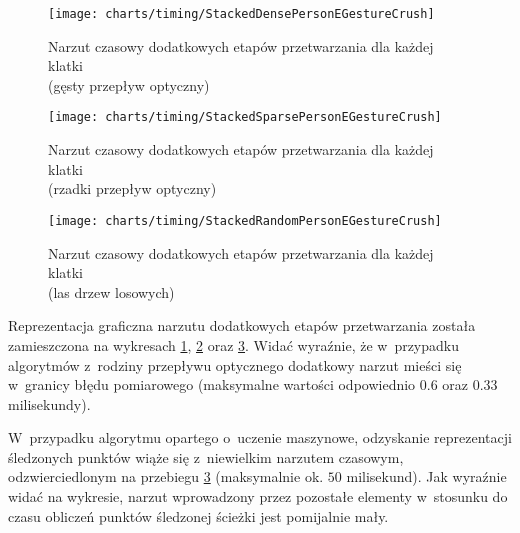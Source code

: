       \begin{figure}[!ht]
        \centering
        \texttt{[image: charts/timing/StackedDensePersonEGestureCrush]}
        \caption[Narzut czasowy dodatkowych etapów przetwarzania dla każdej klatki\\(gęsty przepływ optyczny)]
                {Narzut czasowy dodatkowych etapów przetwarzania dla każdej klatki\\(gęsty przepływ optyczny)}
        \label{fig:StackedDense}
      \end{figure}

      \begin{figure}[!ht]
        \centering
        \texttt{[image: charts/timing/StackedSparsePersonEGestureCrush]}
        \caption[Narzut czasowy dodatkowych etapów przetwarzania dla każdej klatki\\(rzadki przepływ optyczny)]
                {Narzut czasowy dodatkowych etapów przetwarzania dla każdej klatki\\(rzadki przepływ optyczny)}
        \label{fig:StackedSparse}
      \end{figure}

    \newpage
      \begin{figure}[!ht]
        \centering
        \texttt{[image: charts/timing/StackedRandomPersonEGestureCrush]}
        \caption[Narzut czasowy dodatkowych etapów przetwarzania dla każdej klatki\\(las drzew losowych)]
                {Narzut czasowy dodatkowych etapów przetwarzania dla każdej klatki\\(las drzew losowych)}
        \label{fig:StackedRandom}
      \end{figure}

    Reprezentacja graficzna narzutu dodatkowych etapów przetwarzania została zamieszczona na wykresach \ref{fig:StackedDense}, \ref{fig:StackedSparse} oraz \ref{fig:StackedRandom}. Widać wyraźnie, że w~przypadku algorytmów z~rodziny przepływu optycznego dodatkowy narzut mieści się w~granicy błędu pomiarowego (maksymalne wartości odpowiednio $0.6$ oraz $0.33$ milisekundy).

    W~przypadku algorytmu opartego o~uczenie maszynowe, odzyskanie reprezentacji śledzonych punktów wiąże się z~niewielkim narzutem czasowym, odzwierciedlonym na przebiegu \ref{fig:StackedRandom} (maksymalnie ok. $50$ milisekund). Jak wyraźnie widać na wykresie, narzut wprowadzony przez pozostałe elementy w~stosunku do czasu obliczeń punktów śledzonej ścieżki jest pomijalnie mały.


